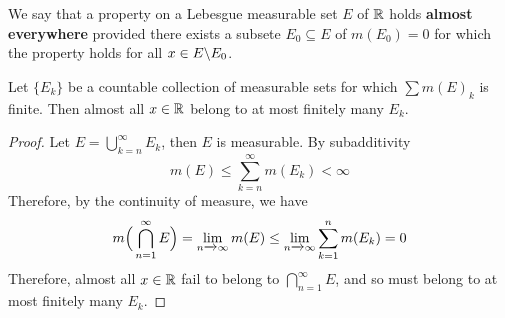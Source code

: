 \begin{definition}
    We say that a property on a Lebesgue measurable set $E$ of  $\mathbb{R}$ holds
    \textbf{almost everywhere} provided there exists a subsete $E_0 \subseteq E$
    of $m(E_0)=0$ for which the property holds for all $x \in E \backslash E_0$.
\end{definition}

\begin{lemma}\label{8.5.3}
    Let $\{E_k\}$ be a countable collection of measurable sets for which
    $\sum{m(E)}_k$ is finite. Then almost all  $x \in \mathbb{R}$ belong to at most
    finitely many $E_k$.
\end{lemma}
\begin{proof}
    Let $E=\bigcup_{k=n}^\infty{E_k}$, then $E$ is measurable. By subadditivity
    \begin{equation*}
        m(E) \leq \sum_{k=n}^\infty{m(E_k)}<\infty
    \end{equation*}
    Therefore, by the continuity of measure, we have
    \begin{equation*}
        m\Big{(} \bigcap_{n=1}^\infty{E} \Big{)}=
        \lim_{n \xrightarrow{} \infty}{m(E)} \leq
        \lim_{n \xrightarrow{} \infty}{\sum_{k=1}^n{m(E_k)}}=0
    \end{equation*}
    Therefore, almost all $x \in \mathbb{R}$ fail to belong to
    $\bigcap_{n=1}^\infty{E}$, and so must belong to at most finitely many
    $E_k$.
\end{proof}
